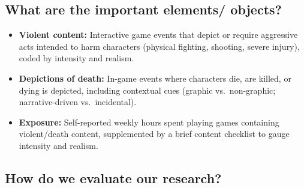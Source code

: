 \subsection{What are the important elements/ objects?}

\begin{itemize}
    \item \textbf{Violent content:} Interactive game events that depict or require aggressive acts intended to harm characters (physical fighting, shooting, severe injury), coded by intensity and realism.
    \item \textbf{Depictions of death:} In-game events where characters die, are killed, or dying is depicted, including contextual cues (graphic vs.\ non-graphic; narrative-driven vs.\ incidental).
    \item \textbf{Exposure:} Self-reported weekly hours spent playing games containing violent/death content, supplemented by a brief content checklist to gauge intensity and realism.
\end{itemize}


\subsection{How do we evaluate our research?}

